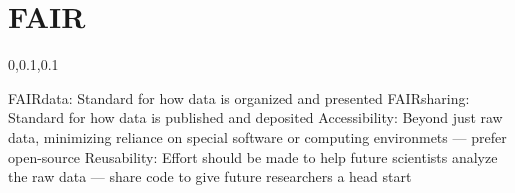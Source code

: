 
\section{FAIR}\fbeg{}\begin{frame}{}


\vspace{-.5em}	

{\Large{}\selectfont

\hspace*{20pt}\begin{minipage}{.96\textwidth}
\vspace{4pt}
		
\begin{lightquadblockc}{0,0.1,0.1}{\parbox{21cm}{\centering \vspace{3pt}}}
\begin{center}\begin{minipage}{\textwidth}
{\Huge \setlength{\leftmargini}{30pt}\begin{enumerate}
\dmitem {\dsp} FAIRdata: Standard for how data is organized and presented 
\vspace{20pt}
\dmitem {\dsp} FAIRsharing: Standard for how data is published and deposited
\vspace{20pt}
\dmitem {\dsp} Accessibility: Beyond just raw data, minimizing reliance on special software or computing environmets 
--- prefer open-source
\vspace{20pt}
\dmitem {\dsp} Reusability: Effort should be made to help future scientists analyze the raw data  
--- share code to give future researchers a head start
\vspace{20pt}
\end{enumerate}
}\end{minipage}
\end{center}
\end{lightquadblockc}
\end{minipage}

}

\end{frame}

